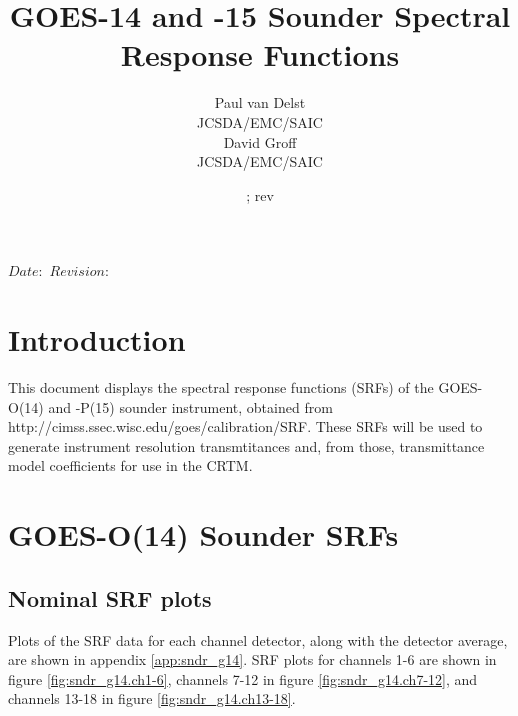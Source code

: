 



\SVN $Date:$
\SVN $Revision:$

\title{GOES-14 and -15 Sounder Spectral Response Functions}
\author{Paul van Delst\\JCSDA/EMC/SAIC\\[0.25in]
        David Groff\\JCSDA/EMC/SAIC}
\date{\SVNDate ; rev\SVNRevision}
\docnumber{ }



\maketitle



\section{Introduction}
This document displays the spectral response functions (SRFs) of the GOES-O(14) and -P(15) sounder instrument, obtained from http://cimss.ssec.wisc.edu/goes/calibration/SRF. These SRFs will be used to generate instrument resolution transmtitances and, from those, transmittance model coefficients for use in the CRTM.


\section{GOES-O(14) Sounder SRFs}

\subsection{Nominal SRF plots}
Plots of the SRF data for each channel detector, along with the detector average, are shown in appendix \ref{app:sndr_g14}. SRF plots for channels 1-6 are shown in figure \ref{fig:sndr_g14.ch1-6}, channels 7-12 in figure \ref{fig:sndr_g14.ch7-12}, and channels 13-18 in figure \ref{fig:sndr_g14.ch13-18}.


